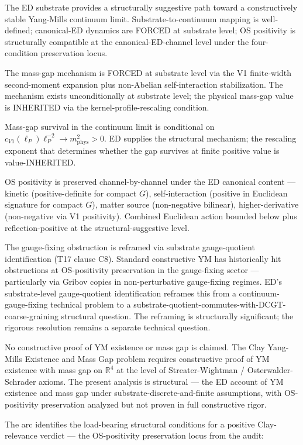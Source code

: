 \documentclass[11pt,a4paper]{article}
\begin{document}
The ED substrate provides a structurally suggestive path toward a constructively stable Yang-Mills continuum limit. Substrate-to-continuum mapping is well-defined; canonical-ED dynamics are FORCED at substrate level; OS positivity is structurally compatible at the canonical-ED-channel level under the four-condition preservation locus.

The mass-gap mechanism is FORCED at substrate level via the V1 finite-width second-moment expansion plus non-Abelian self-interaction stabilization. The mechanism exists unconditionally at substrate level; the physical mass-gap value is INHERITED via the kernel-profile-rescaling condition.

Mass-gap survival in the continuum limit is conditional on $c_{V1}(\ell_P) \ell_P^{-2} \to m_\mathrm{phys}^{2} > 0$. ED supplies the structural mechanism; the rescaling exponent that determines whether the gap survives at finite positive value is value-INHERITED.

OS positivity is preserved channel-by-channel under the ED canonical content --- kinetic (positive-definite for compact $G$), self-interaction (positive in Euclidean signature for compact $G$), matter source (non-negative bilinear), higher-derivative (non-negative via V1 positivity). Combined Euclidean action bounded below plus reflection-positive at the structural-suggestive level.

The gauge-fixing obstruction is reframed via substrate gauge-quotient identification (T17 clause C8). Standard constructive YM has historically hit obstructions at OS-positivity preservation in the gauge-fixing sector --- particularly via Gribov copies in non-perturbative gauge-fixing regimes. ED's substrate-level gauge-quotient identification reframes this from a continuum-gauge-fixing technical problem to a substrate-quotient-commutes-with-DCGT-coarse-graining structural question. The reframing is structurally significant; the rigorous resolution remains a separate technical question.

No constructive proof of YM existence or mass gap is claimed. The Clay Yang-Mills Existence and Mass Gap problem requires constructive proof of YM existence with mass gap on $\mathbb{R}^{4}$ at the level of Streater-Wightman / Osterwalder-Schrader axioms. The present analysis is structural --- the ED account of YM existence and mass gap under substrate-discrete-and-finite assumptions, with OS-positivity preservation analyzed but not proven in full constructive rigor.

The arc identifies the load-bearing structural conditions for a positive Clay-relevance verdict --- the OS-positivity preservation locus from the audit:
\end{document}
